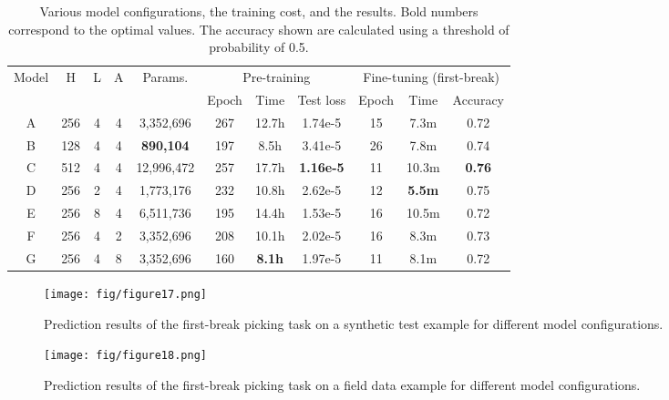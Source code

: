 \documentclass{article}
\begin{document}
\label{sec:configuration}
\begin{table}
 \caption{Various model configurations, the training cost, and the results. Bold numbers correspond to the optimal values. The accuracy shown are calculated using a threshold of probability of 0.5.}
  \centering
  \begin{tabular}{ccccccccccc}
    \toprule
    \multirow{2}{*}{Model} &
    \multirow{2}{*}{H} &
    \multirow{2}{*}{L} &
    \multirow{2}{*}{A} &
    \multirow{2}{*}{Params.} &
    \multicolumn{3}{c}{Pre-training} & \multicolumn{3}{c}{Fine-tuning (first-break)} \\
    \cmidrule(r){6-8} \cmidrule(r){9-11}
    & & & & & Epoch & Time & Test loss & Epoch & Time & Accuracy \\
    \midrule
    A & 256 & 4 & 4 & 3,352,696 & 267 & 12.7h & 1.74e-5 & 15 & 7.3m & 0.72 \\
    B & 128 & 4 & 4 & \textbf{890,104} & 197 & 8.5h & 3.41e-5 & 26 & 7.8m & 0.74 \\
    C & 512 & 4 & 4 & 12,996,472 & 257 & 17.7h & \textbf{1.16e-5} & 11 & 10.3m & \textbf{0.76} \\
    D & 256 & 2 & 4 & 1,773,176 & 232 & 10.8h & 2.62e-5 & 12 & \textbf{5.5m} & 0.75 \\
    E & 256 & 8 & 4 & 6,511,736 & 195 & 14.4h & 1.53e-5 & 16 & 10.5m & 0.72 \\
    F & 256 & 4 & 2 & 3,352,696 & 208 & 10.1h & 2.02e-5 & 16 & 8.3m & 0.73 \\
    G & 256 & 4 & 8 & 3,352,696 & 160 & \textbf{8.1h} & 1.97e-5 & 11 & 8.1m & 0.72 \\
    \bottomrule
  \end{tabular}
  \label{tab:table1}
\end{table}

\begin{figure}[!h]
    \centering
    \texttt{[image: fig/figure17.png]}
    \caption{Prediction results of the first-break picking task on a synthetic test example for different model configurations.}
    \label{fig:fig17}
\end{figure}

\begin{figure}[!h]
    \centering
    \texttt{[image: fig/figure18.png]}
    \caption{Prediction results of the first-break picking task on a field data example for different model configurations.}
    \label{fig:fig18}
\end{figure}
\end{document}

